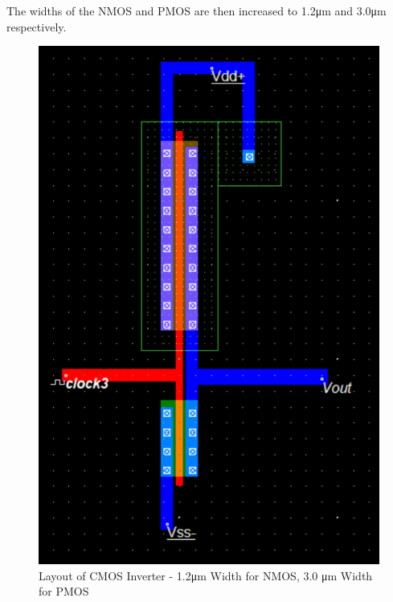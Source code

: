 The widths of the NMOS and PMOS are then increased to 1.2\si{\micro\meter} and 3.0\si{\micro\meter} respectively.

\FloatBarrier

\begin{figure}[h!]
	\centering
	\includegraphics[scale=0.75]{./images/inverter_12nmos30pmos.PNG}
	\caption{Layout of CMOS Inverter - 1.2\si{\micro\meter} Width for NMOS, 3.0 \si{\micro\meter} Width for PMOS}
	\label{fig:inverter_12nmos30pmos}
\end{figure}

\FloatBarrier

\FloatBarrier


